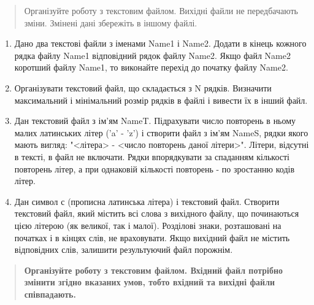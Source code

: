 \documentclass[]{article}
\begin{document}
\begin{quote}
Організуйте роботу з текстовим файлом. Вихідні файли не передбачають
зміни. Змінені дані збережіть в іншому файлі.
\end{quote}

\begin{enumerate}
\def\labelenumi{\arabic{enumi})}
\item
  Дано два текстові файли з іменами Name1 і Name2. Додати в кінець
  кожного рядка файлу Name1 відповідний рядок файлу Name2. Якщо файл
  Name2 коротший файлу Name1, то виконайте перехід до початку файлу
  Name2.
\item
  Організувати текстовий файл, що складається з N рядків. Визначити
  максимальний і мінімальний розмір рядків в файлі і вивести їх в інший
  файл.
\item
  Дан текстовий файл з ім'ям NameT. Підрахувати число повторень в ньому
  малих латинських літер ('a' - 'z') і створити файл з ім'ям NameS,
  рядки якого мають вигляд: "\textless{}літера\textgreater{} -
  \textless{}число повторень даної літери\textgreater{}". Літери,
  відсутні в тексті, в файл не включати. Рядки впорядкувати за спаданням
  кількості повторень літер, а при однаковій кількості повторень - по
  зростанню кодів літер.
\item
  Дан символ с (прописна латинська літера) і текстовий файл. Створити
  текстовий файл, який містить всі слова з вихідного файлу, що
  починаються цією літерою (як великої, так і малої). Розділові знаки,
  розташовані на початках і в кінцях слів, не враховувати. Якщо вихідний
  файл не містить відповідних слів, залишити результуючий файл порожнім.
\end{enumerate}

\begin{quote}
\textbf{Організуйте роботу з текстовим файлом. Вхідний файл потрібно
змінити згідно вказаних умов, тобто вхідний та вихідні файли
співпадають.}
\end{quote}
\end{document}
